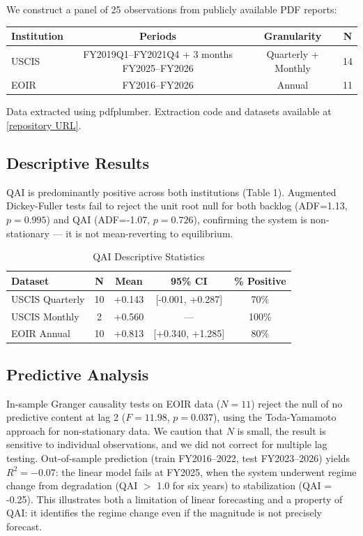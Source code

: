 \documentclass{article}
\begin{document}
We construct a panel of 25 observations from publicly available PDF reports:

\begin{table}[h]
\centering
\small
\begin{tabular}{lccc}
\toprule
Institution & Periods & Granularity & N \\
\midrule
USCIS & FY2019Q1--FY2021Q4 + 3 months FY2025--FY2026 & Quarterly + Monthly & 14 \\
EOIR & FY2016--FY2026 & Annual & 11 \\
\bottomrule
\end{tabular}
\end{table}

Data extracted using pdfplumber. Extraction code and datasets available at \url{[repository URL]}.

\subsection{Descriptive Results}

QAI is predominantly positive across both institutions (Table 1). Augmented Dickey-Fuller tests fail to reject the unit root null for both backlog (ADF=1.13, $p=0.995$) and QAI (ADF=-1.07, $p=0.726$), confirming the system is non-stationary — it is not mean-reverting to equilibrium.

\begin{table}[h]
\centering
\small
\begin{tabular}{lcccc}
\toprule
Dataset & N & Mean & 95\% CI & \% Positive \\
\midrule
USCIS Quarterly & 10 & +0.143 & [-0.001, +0.287] & 70\% \\
USCIS Monthly & 2 & +0.560 & — & 100\% \\
EOIR Annual & 10 & +0.813 & [+0.340, +1.285] & 80\% \\
\bottomrule
\end{tabular}
\caption{QAI Descriptive Statistics}
\end{table}

\subsection{Predictive Analysis}

In-sample Granger causality tests on EOIR data ($N=11$) reject the null of no predictive content at lag 2 ($F=11.98$, $p=0.037$), using the Toda-Yamamoto \cite{toda-yamamoto1995} approach for non-stationary data. We caution that $N$ is small, the result is sensitive to individual observations, and we did not correct for multiple lag testing. Out-of-sample prediction (train FY2016--2022, test FY2023--2026) yields $R^2 = -0.07$: the linear model fails at FY2025, when the system underwent regime change from degradation (QAI $>$ 1.0 for six years) to stabilization (QAI = -0.25). This illustrates both a limitation of linear forecasting and a property of QAI: it identifies the regime change even if the magnitude is not precisely forecast.
\end{document}

